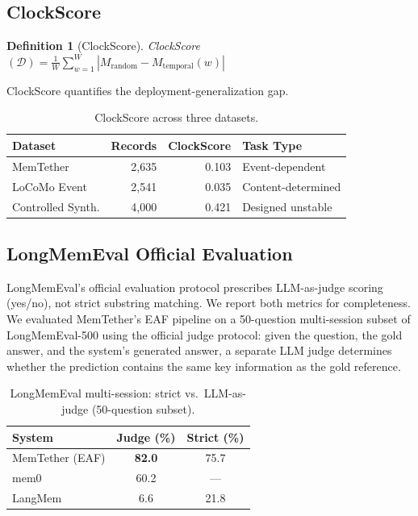 \documentclass[sigconf,nonacm]{acmart}
\newtheorem{definition}{Definition}
\begin{document}
\subsection{ClockScore}

\begin{definition}[ClockScore]
ClockScore$(\mathcal{D}) = \frac{1}{W} \sum_{w=1}^{W} |M_{\text{random}} - M_{\text{temporal}}(w)|$
\end{definition}

ClockScore quantifies the deployment-generalization gap.

\begin{table}[h]
\centering
\caption{ClockScore across three datasets.}
\begin{tabular}{lrrl}
\toprule
Dataset & Records & ClockScore & Task Type \\
\midrule
MemTether & 2{,}635 & 0.103 & Event-dependent \\
LoCoMo Event & 2{,}541 & 0.035 & Content-determined \\
Controlled Synth. & 4{,}000 & 0.421 & Designed unstable \\
\bottomrule
\end{tabular}
\end{table}

\subsection{LongMemEval Official Evaluation}
\label{sec:judge}

LongMemEval's official evaluation protocol prescribes LLM-as-judge scoring (yes/no), not strict substring matching. We report both metrics for completeness. We evaluated MemTether's EAF pipeline on a 50-question multi-session subset of LongMemEval-500 using the official judge protocol: given the question, the gold answer, and the system's generated answer, a separate LLM judge determines whether the prediction contains the same key information as the gold reference.

\begin{table}[h]
\centering
\caption{LongMemEval multi-session: strict vs.\ LLM-as-judge (50-question subset).}
\begin{tabular}{lcc}
\toprule
System & Judge (\%) & Strict (\%) \\
\midrule
MemTether (EAF) & \textbf{82.0} & 75.7 \\
mem0 & 60.2 & --- \\
LangMem & 6.6 & 21.8 \\
\bottomrule
\end{tabular}
\end{table}
\end{document}
